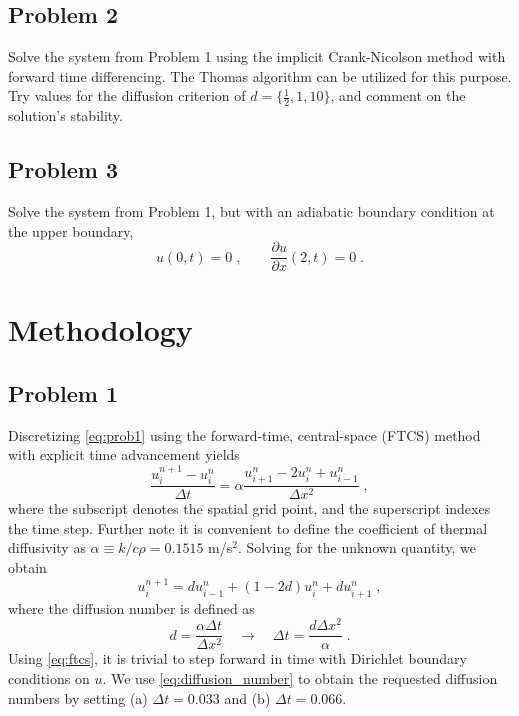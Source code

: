 \documentclass[11pt]{article}
\begin{document}
\subsection{Problem 2}

Solve the system from Problem 1 using the implicit Crank-Nicolson method with forward time differencing. The Thomas algorithm can be utilized for this purpose. Try values for the diffusion criterion of $d = \{\tfrac{1}{2}, 1, 10\}$, and comment on the solution's stability.

\subsection{Problem 3}

Solve the system from Problem 1, but with an adiabatic boundary condition at the upper boundary,
\begin{equation}
u(0,t) = 0 \;, \qquad \frac{\partial u}{\partial x}(2,t) = 0
\;.
\label{eq:prob3}
\end{equation}

\section{Methodology} %

\subsection{Problem 1}

Discretizing \eqref{eq:prob1} using the forward-time, central-space (FTCS) method with explicit time advancement yields
\begin{equation}
\frac{u_i^{n+1} - u_i^n}{\Delta t} = \alpha \frac{u_{i+1}^n - 2u_i^n + u_{i-1}^n}{\Delta x^2}
\;,
\end{equation}
where the subscript denotes the spatial grid point, and the superscript indexes the time step. Further note it is convenient to define the coefficient of thermal diffusivity as $\alpha \equiv k / c \rho = 0.1515$ m/s$^2$. Solving for the unknown quantity, we obtain
\begin{equation}
u_i^{n+1} = d u_{i-1}^n + (1-2d) u_i^n + d u_{i+1}^n
\;,
\label{eq:ftcs}
\end{equation}
where the diffusion number is defined as
\begin{equation}
d = \frac{\alpha \Delta t}{\Delta x^2} 
\quad
\rightarrow
\quad
\Delta t = \frac{d \Delta x^2}{\alpha}
\;.
\label{eq:diffusion_number}
\end{equation}
Using \eqref{eq:ftcs}, it is trivial to step forward in time with Dirichlet boundary conditions on $u$. We use \eqref{eq:diffusion_number} to obtain the requested diffusion numbers by setting (a) $\Delta t = 0.033$ and (b) $\Delta t = 0.066$.
\end{document}
